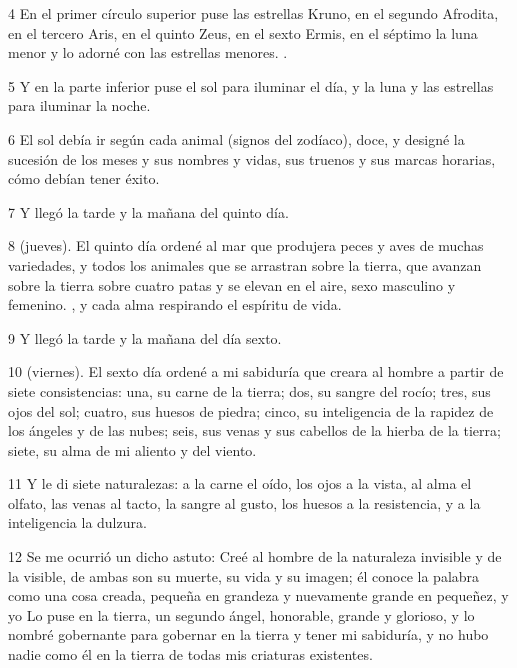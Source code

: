 \par 4 En el primer círculo superior puse las estrellas Kruno, en el segundo Afrodita, en el tercero Aris, en el quinto Zeus, en el sexto Ermis, en el séptimo la luna menor y lo adorné con las estrellas menores. .

\par 5 Y en la parte inferior puse el sol para iluminar el día, y la luna y las estrellas para iluminar la noche.

\par 6 El sol debía ir según cada animal (signos del zodíaco), doce, y designé la sucesión de los meses y sus nombres y vidas, sus truenos y sus marcas horarias, cómo debían tener éxito.

\par 7 Y llegó la tarde y la mañana del quinto día.

\par 8 (jueves). El quinto día ordené al mar que produjera peces y aves de muchas variedades, y todos los animales que se arrastran sobre la tierra, que avanzan sobre la tierra sobre cuatro patas y se elevan en el aire, sexo masculino y femenino. , y cada alma respirando el espíritu de vida.

\par 9 Y llegó la tarde y la mañana del día sexto.

\par 10 (viernes). El sexto día ordené a mi sabiduría que creara al hombre a partir de siete consistencias: una, su carne de la tierra; dos, su sangre del rocío; tres, sus ojos del sol; cuatro, sus huesos de piedra; cinco, su inteligencia de la rapidez de los ángeles y de las nubes; seis, sus venas y sus cabellos de la hierba de la tierra; siete, su alma de mi aliento y del viento.

\par 11 Y le di siete naturalezas: a la carne el oído, los ojos a la vista, al alma el olfato, las venas al tacto, la sangre al gusto, los huesos a la resistencia, y a la inteligencia la dulzura.

\par 12 Se me ocurrió un dicho astuto: Creé al hombre de la naturaleza invisible y de la visible, de ambas son su muerte, su vida y su imagen; él conoce la palabra como una cosa creada, pequeña en grandeza y nuevamente grande en pequeñez, y yo Lo puse en la tierra, un segundo ángel, honorable, grande y glorioso, y lo nombré gobernante para gobernar en la tierra y tener mi sabiduría, y no hubo nadie como él en la tierra de todas mis criaturas existentes.

